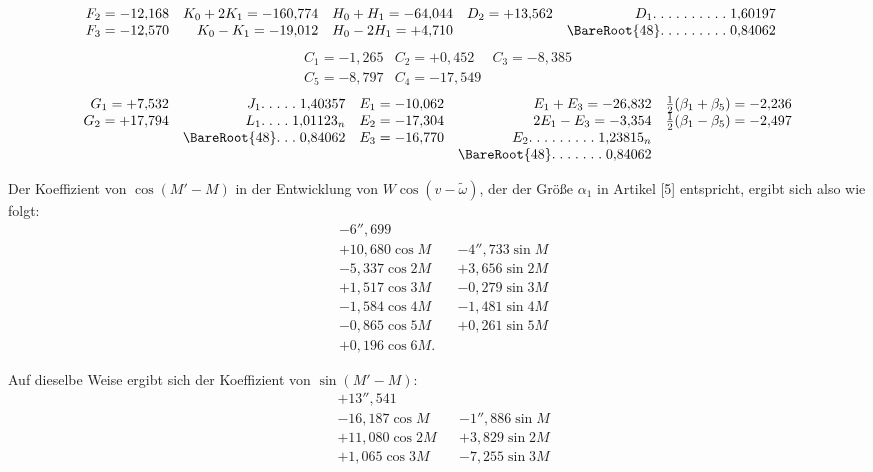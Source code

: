 \begin{landscape}
\[\begin{array}{rrrrrr}
F_2=-12{,}168&K_0+2K_1=-160{,}774&H_0+H_1=-64{,}044&D_2=+13{,}562&D_1\VSevenFivePoints\VSevenFivePoints1{,}60197&\\
F_3=-12{,}570&K_0-K_1=-19{,}012&H_0-2H_1=+4{,}710&&\BareRoot{48}\VSevenFivePoints\VSevenPoint\VSevenPoint\VSevenPoint\VSevenPoint0{,}84062&
\end{array}
\]
\[
\begin{array}{rrr}
C_1=-1{,}265&C_2=+0{,}452&C_3=-8{,}385\\
C_5=-8{,}797&C_4=-17{,}549&
\end{array}
\]
\[
\begin{array}{rrrrr}
G_1=+7{,}532&J_1\VSevenFivePoints1{,}40357&E_1=-10{,}062&E_1+E_3=-26{,}832&\frac12(\beta_1+\beta_5)=-2{,}236\\
G_2=+17{,}794&L_1\VSevenPoint\VSevenPoint\VSevenPoint\VSevenPoint1{,}01123_n&E_2=-17{,}304&2E_1-E_3=-3{,}354&\frac12(\beta_1-\beta_5)=-2{,}497\\
&\BareRoot{48}\VSevenPoint\VSevenPoint\VSevenPoint0{,}84062&E_3=-16{,}770&E_2\VSevenFivePoints\VSevenPoint\VSevenPoint\VSevenPoint\VSevenPoint1{,}23815_n&\\
&&&\BareRoot{48}\VSevenFivePoints\VSevenPoint\VSevenPoint0{,}84062&
\end{array}
\]
\par\noindent\hspace*{\parindent}Der Koeffizient von \(\cos(M'-M)\) in der Entwicklung von \(W\cos(v-\tilde\omega)\), der der Größe \(\alpha_1\) in Artikel [5] entspricht, ergibt sich also wie folgt:
\[
\begin{aligned}
&-6''{,}699\\
&+10{,}680\cos M&&-4''{,}733\sin M\\
&-5{,}337\cos2M&&+3{,}656\sin2M\\
&+1{,}517\cos3M&&-0{,}279\sin3M\\
&-1{,}584\cos4M&&-1{,}481\sin4M\\
&-0{,}865\cos5M&&+0{,}261\sin5M\\
&+0{,}196\cos6M.
\end{aligned}
\]
\par\noindent Auf dieselbe Weise ergibt sich der Koeffizient von \(\sin(M'-M)\):
\[
\begin{aligned}
&+13''{,}541\\
&-16{,}187\cos M&&-1''{,}886\sin M\\
&+11{,}080\cos2M&&+3{,}829\sin2M\\
&+1{,}065\cos3M&&-7{,}255\sin3M\\

\end{aligned}\]
\end{landscape}
